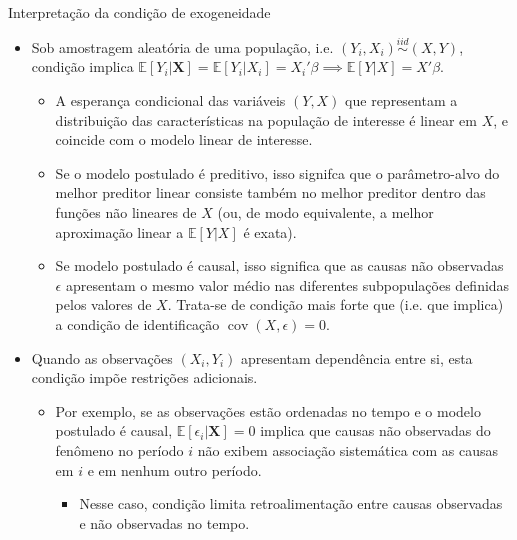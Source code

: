 \documentclass[11pt]{beamer}
\begin{document}
\begin{frame}{Interpretação da condição de exogeneidade}
\begin{itemize}


		\item Sob amostragem aleatória de uma população, i.e. $(Y_i,X_i)\overset{iid}{\sim}(X,Y)$, condição implica $\mathbb{E}[Y_i|\boldsymbol{X}] = \mathbb{E}[Y_i|X_i] = X_i'\beta \implies \mathbb{E}[Y|X]=X'\beta$.
		\begin{itemize}
			\item A esperança condicional das variáveis $(Y,X)$ que representam a distribuição das características na população de interesse é linear em $X$, {\color{green}e coincide com o modelo linear de interesse}.
				\item Se o modelo postulado é {\color{blue}preditivo}, isso signifca que o parâmetro-alvo do melhor preditor linear consiste também no melhor preditor dentro das funções não lineares de $X$ (ou, de modo equivalente, a melhor aproximação linear a $\mathbb{E}[Y|X]$ é exata).
				\item Se modelo postulado é {\color{blue}causal}, isso significa que as causas não observadas $\epsilon$ apresentam o mesmo valor médio nas diferentes subpopulações definidas pelos valores de $X$. Trata-se de condição mais forte que (i.e. que implica) a condição de identificação $\operatorname{cov}(X,\epsilon) = 0$.
		\end{itemize}
					\item Quando as observações $(X_i,Y_i)$  apresentam dependência entre si, esta condição impõe restrições adicionais.
					\begin{itemize}
						\item Por exemplo, se as observações estão ordenadas no tempo e o modelo postulado é causal, $\mathbb{E}[\epsilon_i|\boldsymbol{X}]=0$ implica que causas não observadas  do fenômeno no período $i$ não exibem associação sistemática com as causas em $i$ {\color{red}e em nenhum outro período}.
						\begin{itemize}
							\item Nesse caso, condição limita retroalimentação entre causas observadas e não observadas no tempo.
						\end{itemize}
					\end{itemize} 
	\end{itemize}

\end{frame}
\end{document}

